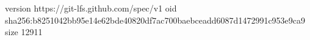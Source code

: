 version https://git-lfs.github.com/spec/v1
oid sha256:b8251042bb95e14e62bde40820df7ac700baebceadd6087d1472991c953e9ca9
size 12911

